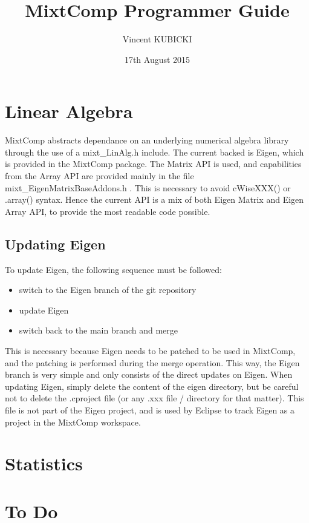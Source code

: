 \documentclass{article}
\title{MixtComp Programmer Guide}
\author{Vincent KUBICKI}
\date{17th August 2015}
\begin{document}
\maketitle

\section{Linear Algebra}

MixtComp abstracts dependance on an underlying numerical algebra library through the use of a mixt_LinAlg.h include. The current backed is Eigen, which is provided in the MixtComp package. The Matrix API is used, and capabilities from the Array API are provided mainly in the file mixt_EigenMatrixBaseAddons.h . This is necessary to avoid cWiseXXX() or .array() syntax. Hence the current API is a mix of both Eigen Matrix and Eigen Array API, to provide the most readable code possible.

\subsection{Updating Eigen}

To update Eigen, the following sequence must be followed:

\begin{itemize}
\item switch to the Eigen branch of the git repository
\item update Eigen
\item switch back to the main branch and merge
\end{itemize}

This is necessary because Eigen needs to be patched to be used in MixtComp, and the patching is performed during the merge operation. This way, the Eigen branch is very simple and only consists of the direct updates on Eigen. When updating Eigen, simply delete the content of the eigen directory, but be careful not to delete the .cproject file (or any .xxx file / directory for that matter). This file is not part of the Eigen project, and is used by Eclipse to track Eigen as a project in the MixtComp workspace.

\section{Statistics}

\section{To Do}
\end{document}
